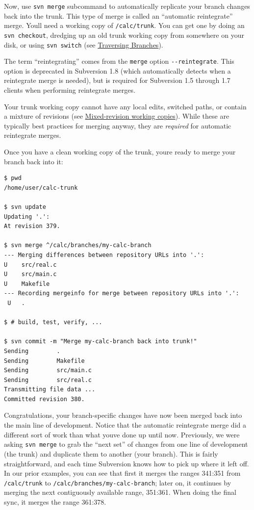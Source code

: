 Now, use \texttt{svn\ merge} subcommand to automatically replicate your
branch changes back into the trunk. This type of merge is called an
``automatic reintegrate'' merge. You\textquotesingle ll need a working
copy of \texttt{/calc/trunk}. You can get one by doing an
\texttt{svn\ checkout}, dredging up an old trunk working copy from
somewhere on your disk, or using \texttt{svn\ switch} (see
\hyperref[svn.branchmerge.switchwc]{Traversing Branches}).

The term ``reintegrating'' comes from the \texttt{merge} option
\texttt{-\/-reintegrate}. This option is deprecated in Subversion 1.8
(which automatically detects when a reintegrate merge is needed), but is
required for Subversion 1.5 through 1.7 clients when performing
reintegrate merges.

Your trunk working copy cannot have any local edits, switched paths, or
contain a mixture of revisions (see
\hyperref[svn.basic.in-action.mixedrevs]{Mixed-revision working
copies}). While these are typically best practices for merging anyway,
they are \emph{required} for automatic reintegrate merges.

Once you have a clean working copy of the trunk, you\textquotesingle re
ready to merge your branch back into it:

\begin{verbatim}
$ pwd
/home/user/calc-trunk

$ svn update
Updating '.':
At revision 379.

$ svn merge ^/calc/branches/my-calc-branch
--- Merging differences between repository URLs into '.':
U    src/real.c
U    src/main.c
U    Makefile
--- Recording mergeinfo for merge between repository URLs into '.':
 U   .

$ # build, test, verify, ...

$ svn commit -m "Merge my-calc-branch back into trunk!"
Sending        .
Sending        Makefile
Sending        src/main.c
Sending        src/real.c
Transmitting file data ...
Committed revision 380.
\end{verbatim}

Congratulations, your branch-specific changes have now been merged back
into the main line of development. Notice that the automatic reintegrate
merge did a different sort of work than what you\textquotesingle ve done
up until now. Previously, we were asking \texttt{svn\ merge} to grab the
``next set'' of changes from one line of development (the trunk) and
duplicate them to another (your branch). This is fairly straightforward,
and each time Subversion knows how to pick up where it left off. In our
prior examples, you can see that first it merges the ranges 341:351 from
\texttt{/calc/trunk} to \texttt{/calc/branches/my-calc-branch}; later
on, it continues by merging the next contiguously available range,
351:361. When doing the final sync, it merges the range 361:378.

